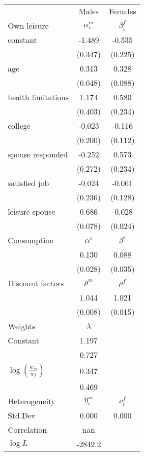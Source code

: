 \begin{tabular}{lcc} 
\hline\hline 
 & Males & Females \\ 
Own leisure & $\alpha_{i}^{m}$ & $\beta_{i}^{f}$ \\ 
constant & -1.489 & -0.535 \\ 
 & (0.347) & (0.225) \\ 
age & 0.313 & 0.328 \\ 
 & (0.048) & (0.088) \\ 
health limitations & 1.174 & 0.580 \\ 
 & (0.403) & (0.234) \\ 
college & -0.023 & -0.116 \\ 
 & (0.200) & (0.112) \\ 
spouse responded & -0.252 & 0.573 \\ 
 & (0.272) & (0.234) \\ 
satisfied job & -0.024 & -0.061 \\ 
 & (0.236) & (0.128) \\ 
leisure spouse & 0.686 & -0.028 \\ 
 & (0.078) & (0.024) \\ 
Consumption & $\alpha^{c}$ & $\beta^{c}$ \\ 
 & 0.130 & 0.088 \\ 
 & (0.028) & (0.035) \\ 
Discount factors & $\rho^m$ & $\rho^f$ \\ 
 & 1.044 & 1.021 \\ 
 & (0.008) & (0.015) \\ 
Weights & $\lambda$ &  \\ 
Constant & 1.197 &  \\ 
 & 0.727 &  \\ 
$\log(\frac{w_m}{w_f})$ & 0.347 &  \\ 
 & 0.469 &  \\ 
Heterogeneity & $\eta_i^m$ & $\nu_i^f$ \\ 
Std.Dev & 0.000 & 0.000 \\ 
Correlation & nan &  \\ 
\hline 
$\log L$ & -2842.2 & \\ 
\hline \hline 
\end{tabular} 
